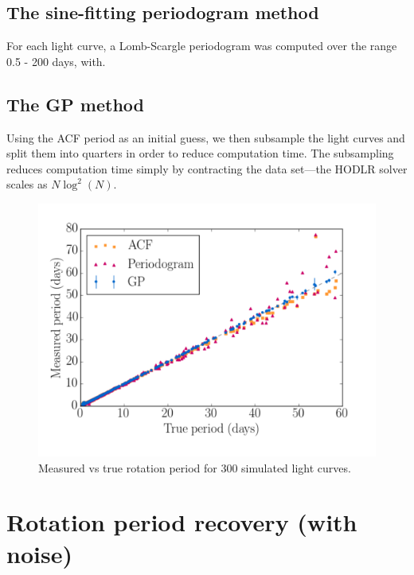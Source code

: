 \subsection{The sine-fitting periodogram method}

For each light curve, a Lomb-Scargle periodogram was computed over the range
0.5 - 200 days, with.

\subsection{The GP method}

Using the ACF period as an initial guess, we then subsample the light curves
and split them into \kepler quarters in order to reduce computation time.
The subsampling reduces computation time simply by contracting the data
set---the HODLR solver scales as $N \log ^2 (N)$.

\begin{figure}
\begin{center}
\includegraphics[width=6in, clip=true]{figures/compare2.pdf}
\caption{Measured vs true rotation period for 300 simulated light curves.}
\end{center}
\end{figure}
\label{fig:compare_noise_free}

\section{Rotation period recovery (with noise)}

